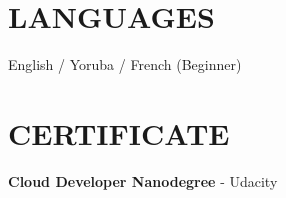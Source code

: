 \documentclass[a4paper,11pt]{article}
\begin{document}
\section{LANGUAGES}
English / Yoruba / French (Beginner)

%
%
%
%
%
%
%
%
%
%
%

\section{CERTIFICATE}
\textbf{Cloud Developer Nanodegree} - Udacity

\vfill
\end{document}
